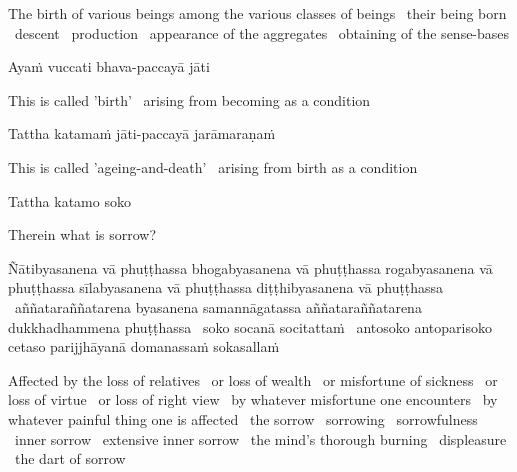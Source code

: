 \begin{cprenglish}
  The birth of various beings among the various classes of beings \breathmark\ their being born \breathmark\ descent \breathmark\ production \breathmark\ appearance of the aggregates \breathmark\ obtaining of the sense-bases
\end{cprenglish}

Ayaṁ vuccati bhava-paccayā jāti

\begin{cprenglish}
  This is called 'birth' \breathmark\ arising from becoming as a condition
\end{cprenglish}

Tattha katamaṁ jāti-paccayā jarāmaraṇaṁ

\begin{cprenglish}
  This is called 'ageing-and-death' \breathmark\ arising from birth as a condition
\end{cprenglish}

Tattha katamo soko

\begin{cprenglish}
  Therein what is sorrow?
\end{cprenglish}

Ñātibyasanena vā phuṭṭhassa bhogabyasanena vā phuṭṭhassa rogabyasanena vā phuṭṭhassa sīlabyasanena vā phuṭṭhassa diṭṭhibyasanena vā phuṭṭhassa \breathmark\ aññataraññatarena byasanena samannāgatassa aññataraññatarena dukkhadhammena phuṭṭhassa \breathmark\ soko socanā socitattaṁ \breathmark\ antosoko antoparisoko cetaso parijjhāyanā domanassaṁ sokasallaṁ

\begin{cprenglish}
  Affected by the loss of relatives \breathmark\ or loss of wealth \breathmark\ or misfortune of sickness \breathmark\ or loss of virtue \breathmark\ or loss of right view
  \breathmark\ by whatever misfortune one encounters \breathmark\ by whatever painful thing one is affected \breathmark\ the sorrow \breathmark\ sorrowing \breathmark\ sorrowfulness \breathmark\ inner sorrow \breathmark\ extensive inner sorrow \breathmark\ the mind’s thorough burning \breathmark\ displeasure \breathmark\ the dart of sorrow
\end{cprenglish}

